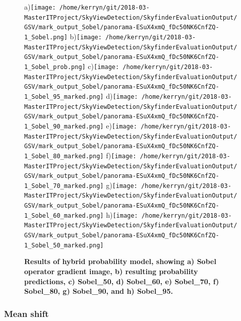 \documentclass[final,3p,times,authoryear]{elsarticle}
\begin{document}
\begin{figure}
\centering    
a)\texttt{[image: /home/kerryn/git/2018-03-MasterITProject/SkyViewDetection/SkyfinderEvaluationOutput/GSV/mark\_output\_Sobel/panorama-ESuX4xmQ\_fDc50NK6CnfZQ-1\_Sobel.png]} 
b)\texttt{[image: /home/kerryn/git/2018-03-MasterITProject/SkyViewDetection/SkyfinderEvaluationOutput/GSV/mark\_output\_Sobel/panorama-ESuX4xmQ\_fDc50NK6CnfZQ-1\_Sobel\_prob.png]} 
c)\texttt{[image: /home/kerryn/git/2018-03-MasterITProject/SkyViewDetection/SkyfinderEvaluationOutput/GSV/mark\_output\_Sobel/panorama-ESuX4xmQ\_fDc50NK6CnfZQ-1\_Sobel\_95\_marked.png]} 
d)\texttt{[image: /home/kerryn/git/2018-03-MasterITProject/SkyViewDetection/SkyfinderEvaluationOutput/GSV/mark\_output\_Sobel/panorama-ESuX4xmQ\_fDc50NK6CnfZQ-1\_Sobel\_90\_marked.png]} 
e)\texttt{[image: /home/kerryn/git/2018-03-MasterITProject/SkyViewDetection/SkyfinderEvaluationOutput/GSV/mark\_output\_Sobel/panorama-ESuX4xmQ\_fDc50NK6CnfZQ-1\_Sobel\_80\_marked.png]} 
f)\texttt{[image: /home/kerryn/git/2018-03-MasterITProject/SkyViewDetection/SkyfinderEvaluationOutput/GSV/mark\_output\_Sobel/panorama-ESuX4xmQ\_fDc50NK6CnfZQ-1\_Sobel\_70\_marked.png]} 
g)\texttt{[image: /home/kerryn/git/2018-03-MasterITProject/SkyViewDetection/SkyfinderEvaluationOutput/GSV/mark\_output\_Sobel/panorama-ESuX4xmQ\_fDc50NK6CnfZQ-1\_Sobel\_60\_marked.png]} 
h)\texttt{[image: /home/kerryn/git/2018-03-MasterITProject/SkyViewDetection/SkyfinderEvaluationOutput/GSV/mark\_output\_Sobel/panorama-ESuX4xmQ\_fDc50NK6CnfZQ-1\_Sobel\_50\_marked.png]} 
\caption{\bf  Results of hybrid probability model, showing a) Sobel operator gradient image, b) resulting probability predictions, c) Sobel\_50, d) Sobel\_60, e) Sobel\_70, f) Sobel\_80, g) Sobel\_90, and h) Sobel\_95.}    
 \label{fig:sobolresults}  
\end{figure} 

\subsubsection{Mean shift}\label{sec:mean}
\end{document}

